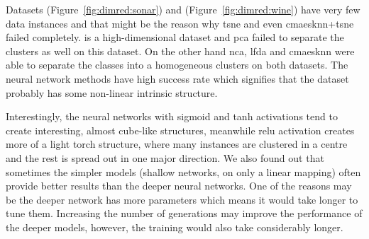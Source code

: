 Datasets  (Figure~\ref{fig:dimred:sonar}) and  (Figure~\ref{fig:dimred:wine}) have very few data instances and that might be the reason why \ac{tsne} and even \ac{cmaesknn}+\ac{tsne} failed completely.  is a high-dimensional dataset and \ac{pca} failed to separate the clusters as well on this dataset. On the other hand \ac{nca}, \ac{lfda} and \ac{cmaesknn} were able to separate the classes into a homogeneous clusters on both datasets. The neural network methods have high success rate which signifies that the dataset probably has some non-linear intrinsic structure.

Interestingly, the neural networks with sigmoid and \ac{tanh} activations tend to create interesting, almost cube-like structures, meanwhile \ac{relu} activation creates more of a light torch structure, where many instances are clustered in a centre and the rest is spread out in one major direction. We also found out that sometimes the simpler models (shallow networks, on only a linear mapping) often provide better results than the deeper neural networks. One of the reasons may be the deeper network has more parameters which means it would take longer to tune them. Increasing the number of generations may improve the performance of the deeper models, however, the training would also take considerably longer.


